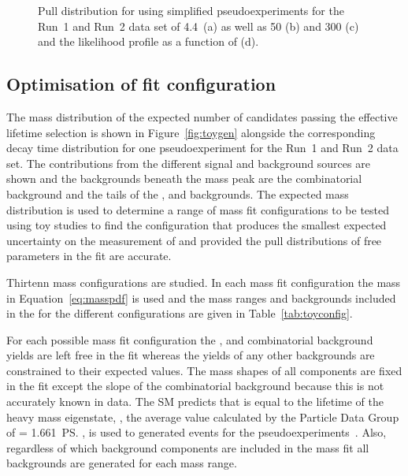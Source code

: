 {\begin{figure}[tbp]
  \caption{Pull distribution for \Gmumu using simplified pseudoexperiments for the Run~1 and Run~2 data set of 4.4~\fb (a) as well as 50 (b) and 300 (c) \fb and the likelihood profile as a function of \Gmumu (d).}
    \label{fig:gammapulls}
\end{figure}




\subsection{Optimisation of fit configuration}
\label{sec:toyresults}

The mass distribution of the expected number of \bsmumu candidates passing the effective lifetime selection is shown in Figure~\ref{fig:toygen} alongside the corresponding decay time distribution for one pseudoexperiment for the Run~1 and Run~2 data set. 
The contributions from the different signal and background sources are shown and the backgrounds beneath the \bs mass peak are the combinatorial background and the tails of the \bhh, \bdmumu and \lambdab backgrounds. The expected mass distribution is used to determine a range of mass fit configurations to be tested using toy studies to find the configuration that produces the smallest expected uncertainty on the measurement of \tmumu and \Gmumu provided the pull distributions of free parameters in the fit are accurate.



Thirtenn mass configurations are studied. In each mass fit configuration the mass \pdf in Equation~\ref{eq:masspdf} is used and the mass ranges and backgrounds included in the \pdf for the different configurations are given in Table~\ref{tab:toyconfig}.


For each possible mass fit configuration the \bsmumu, \bdmumu and combinatorial background yields are left free in the fit whereas the yields of any other backgrounds are constrained to their expected values. The mass shapes of all components are fixed in the \ml fit except the slope of the combinatorial background because this is not accurately known in data. 
The SM predicts that \tmumu is equal to the lifetime of the heavy \bs mass eigenstate, \tH, the average value calculated by the Particle Data Group of \tmumu = 1.661~\ps, is used to generated events for the pseudoexperiments~\cite{Olive:2016xmw}. %
Also, regardless of which background components are included in the mass fit all backgrounds are generated for each mass range. %

}
